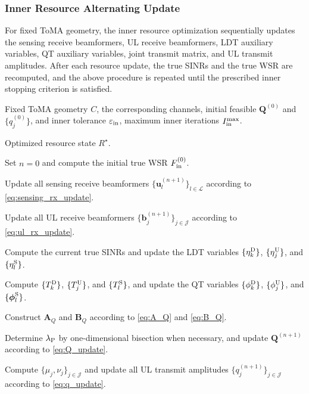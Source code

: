 \documentclass[letterpaper,journal]{IEEEtran}
\begin{document}
\subsubsection{Inner Resource Alternating Update}

For fixed ToMA geometry, the inner resource optimization sequentially updates the sensing receive beamformers, UL receive beamformers, LDT auxiliary variables, QT auxiliary variables, joint transmit matrix, and UL transmit amplitudes. After each resource update, the true SINRs and the true WSR are recomputed, and the above procedure is repeated until the prescribed inner stopping criterion is satisfied.
\begin{algorithm}[t]
\caption{FP-Based Inner Resource Optimization}
\label{alg:inner_fp}
\begin{algorithmic}[1]

\REQUIRE Fixed ToMA geometry $C$, the corresponding channels,
initial feasible $\mathbf Q^{(0)}$ and $\{q_j^{(0)}\}$,
and inner tolerance $\varepsilon_{\rm in}$,
maximum inner iterations $I_{\rm in}^{\max}$.

\ENSURE Optimized resource state $R^\star$.

\STATE Set $n=0$ and compute the initial true WSR
$F_{\rm in}^{(0)}$.

\REPEAT

    \STATE Update all sensing receive beamformers
    $\{\mathbf u_l^{(n+1)}\}_{l\in\mathcal L}$
    according to \eqref{eq:sensing_rx_update}.

    \STATE Update all UL receive beamformers
    $\{\mathbf b_j^{(n+1)}\}_{j\in\mathcal J}$
    according to \eqref{eq:ul_rx_update}.

    \STATE Compute the current true SINRs and update the LDT variables
    $\{\eta_k^{\rm D}\}$, $\{\eta_j^{\rm U}\}$, and $\{\eta_l^{\rm S}\}$.

    \STATE Compute $\{T_k^{\rm D}\}$, $\{T_j^{\rm U}\}$, and
    $\{T_l^{\rm S}\}$, and update the QT variables
    $\{\phi_k^{\rm D}\}$, $\{\phi_j^{\rm U}\}$, and
    $\{\boldsymbol\phi_l^{\rm S}\}$.

    \STATE Construct $\mathbf A_Q$ and $\mathbf B_Q$
    according to \eqref{eq:A_Q} and \eqref{eq:B_Q}.

    \STATE Determine $\lambda_{\rm P}$ by one-dimensional bisection
    when necessary, and update $\mathbf Q^{(n+1)}$
    according to \eqref{eq:Q_update}.

    \STATE Compute $\{\mu_j,\nu_j\}_{j\in\mathcal J}$ and update all
    UL transmit amplitudes $\{q_j^{(n+1)}\}_{j\in\mathcal J}$
    according to \eqref{eq:q_update}.


\end{algorithmic}
\end{algorithm}
\end{document}

